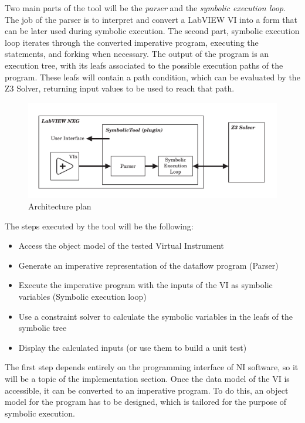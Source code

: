 Two main parts of the tool will be the \emph{parser} and the \emph{symbolic execution loop}. The job of the parser is to interpret and convert a LabVIEW VI into a form that can be later used during symbolic execution. The second part, symbolic execution loop iterates through the converted imperative program, executing the statements, and forking when necessary. The output of the program is an execution tree, with its leafs associated to the possible execution paths of the program. These leafs will contain a path condition, which can be evaluated by the Z3 Solver, returning input values to be used to reach that path.
\begin{figure}
\includegraphics[width=150mm,keepaspectratio]{figures/architecture.pdf}
\caption{Architecture plan} 
\label{fig:architectureplan}
\end{figure}


The steps executed by the tool will be the following:

\begin{itemize}
  \item Access the object model of the tested Virtual Instrument
  \item Generate an imperative representation of the dataflow program (Parser)
  \item Execute the imperative program with the inputs of the VI as symbolic variables (Symbolic execution loop)
   \item Use a constraint solver to calculate the symbolic variables
in the leafs of the symbolic tree
     \item Display the calculated inputs (or use them to build a unit test)
  \end{itemize}

The first step depends entirely on the programming interface of NI software, so it will be a topic of the implementation section. Once the data model of the VI is accessible, it can be converted to an imperative program. To do this, an object model for the program has to be designed, which is tailored for the purpose of symbolic execution.

